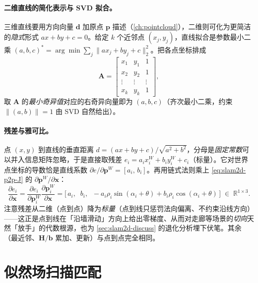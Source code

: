 \paragraph{二维直线的简化表示与 SVD 拟合。}
三维直线要用方向向量 $\mathbf{d}$ 加原点 $\mathbf{p}$ 描述（\cref{ch:pointcloud}），二维则可化为更简洁的\emph{隐式}形式 $a x + b y + c = 0$。给定 $k$ 个近邻点 $(x_j,y_j)$，直线拟合是参数最小二乘 $(a,b,c)^*=\arg\min\sum_j\|a x_j+b y_j+c\|_2^2$。把各点坐标排成
\begin{equation}
\mathbf{A}=\begin{bmatrix} x_1 & y_1 & 1\\ x_2 & y_2 & 1\\ \vdots & \vdots & \vdots\\ x_k & y_k & 1\end{bmatrix},
\label{eq:slam2d-line-A}
\end{equation}
取 $\mathbf{A}$ 的\emph{最小奇异值}对应的右奇异向量即为 $(a,b,c)$（齐次最小二乘，约束 $\|(a,b)\|=1$ 由 SVD 自然给出）。

\paragraph{残差与雅可比。}
点 $(x,y)$ 到直线的垂直距离 $d=(a x+b y+c)/\sqrt{a^2+b^2}$，分母是\emph{固定常数}可以并入信息矩阵忽略，于是直接取残差 $e_i=a_i x_i^W+b_i y_i^W+c_i$（标量）。它对世界点坐标的导数恰是直线系数 $\partial e/\partial\mathbf{p}^W=[a_i,\,b_i]$。再用链式法则乘上 \cref{eq:slam2d-p2p-J} 的 $\partial\mathbf{p}^W/\partial\mathbf{x}$：
\begin{equation}
\frac{\partial e_i}{\partial\mathbf{x}}
=\frac{\partial e_i}{\partial\mathbf{p}_i^W}\frac{\partial\mathbf{p}_i^W}{\partial\mathbf{x}}
=\Big[\,a_i,\;\; b_i,\;\; -a_i\rho_i\sin(\alpha_i+\theta)+b_i\rho_i\cos(\alpha_i+\theta)\,\Big]\;\in\;\mathbb{R}^{1\times 3}.
\label{eq:slam2d-p2l-J}
\end{equation}
注意残差从二维（点到点）降为\emph{标量}（点到线只惩罚法向偏离、不约束沿线方向）——这正是点到线在「沿墙滑动」方向上给出零梯度、从而对走廊等场景的\emph{切向}天然「放手」的代数根源，也为 \cref{sec:slam2d-discuss} 的退化分析埋下伏笔。其余（最近邻、$\mathbf{H}/\mathbf{b}$ 累加、更新）与点到点完全相同。

\section{似然场扫描匹配}
\label{sec:slam2d-lf}

